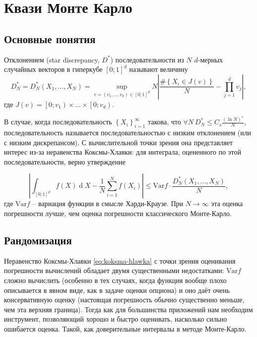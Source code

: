 \documentclass[specialist,
               substylefile = ../spbu.rtx,
               subf,href,colorlinks=true, 12pt]{disser}
\newcommand{\abs}[1]{\left\lvert#1\right\rvert}
\DeclareMathOperator{\dd}{d}
\begin{document}


\chapter{Квази Монте Карло} %
\label{cha:quasi_monte_carlo}

\section{Основные понятия} %
\label{sec:quasi_mc_definition}

Отклонением (star discrepancy, $D^*$) последовательности из $N$ $d$-мерных случайных векторов в гиперкубе $\left[0;1\right]^d$ называют величину
$$D_N^* = D_N^*\left(X_1, \dots, X_N\right) = \sup_{v = (v_1, \dots, v_d) \in \left[0;1\right]^d} N \abs{\frac{\#\left\{ X_i \in J(v) \right\}}{N} - \prod_{j = 1}^d v_j},$$
где $J(v) = \left[0; v_1\right) \times \dots \times \left[0; v_d\right)$.

В случае, когда последовательность $\left\{ X_i\right\}_{i=1}^\infty$ такова, что $\forall N \: D_N^* \leq C_s \frac{(\ln N)^s}{N}$, последовательность называется последовательностью с низким отклонением (или с низким дискрепансом). С вычислительной точки зрения она представляет интерес из-за неравенства Коксмы-Хлавки: для интеграла, оцененного по этой последовательности, верно утверждение

\begin{equation}\label{eq:koksma-hlawka}
\abs{\int_{\left[0;1\right]^d} f(X) \dd X - \frac{1}{N}\sum_{i=1}^N f(X_i)} \leq \mathrm{Var}f\cdot \frac{D_N^*\left(X_1, \dots, X_N\right)}{N},
\end{equation}
где $\mathrm{Var}f$ -- вариация функции в смысле Харди-Краузе. При $N\to\infty$ эта оценка погрешности лучше, чем оценка погрешности классического Монте-Карло.

\section{Рандомизация} %
\label{sec:randomization}

Неравенство Коксмы-Хлавки \eqref{eq:koksma-hlawka} с точки зрения оценивания погрешности вычислений обладает двумя существенными недостатками: $\mathrm{Var}f$ сложно вычислить (особенно в тех случаях, когда функция вообще плохо описывается в явном виде, как в задаче оценки опциона) и оно даёт очень консервативную оценку (настоящая погрешность обычно существенно меньше, чем эта верхняя граница). Тогда как для большинства приложений нам необходим инструмент, позволяющий хорошо и быстро оценивать, насколько сильно ошибается оценка. Такой, как доверительные интервалы в методе Монте-Карло.
\end{document}
